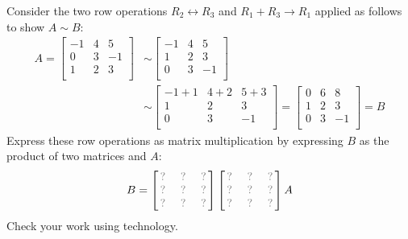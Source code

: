 \begin{applicationActivities}
\begin{activity}{10}
Consider the two row operations 
\(R_2\leftrightarrow R_3\) and \(R_1+R_3\to R_1\)
applied as follows to show \(A\sim B\):
\begin{align*}
A
  =
\begin{bmatrix}
-1&4&5\\
0&3&-1\\
1&2&3\\
\end{bmatrix}
  &\sim
\begin{bmatrix}
-1&4&5\\
1&2&3\\
0&3&-1\\
\end{bmatrix}
  \\&\sim
\begin{bmatrix}
-1+1&4+2&5+3\\
1&2&3\\
0&3&-1\\
\end{bmatrix}
  =
\begin{bmatrix}
0&6&8\\
1&2&3\\
0&3&-1\\
\end{bmatrix}
  = 
B
\end{align*}
Express these row operations as matrix multiplication
by expressing \(B\) as the product of two matrices and \(A\):
\[
B =
\begin{bmatrix}
\unknown&\unknown&\unknown\\
\unknown&\unknown&\unknown\\
\unknown&\unknown&\unknown
\end{bmatrix}
\begin{bmatrix}
\unknown&\unknown&\unknown\\
\unknown&\unknown&\unknown\\
\unknown&\unknown&\unknown
\end{bmatrix}
A
\]
Check your work using technology.
\end{activity}






\end{applicationActivities}
